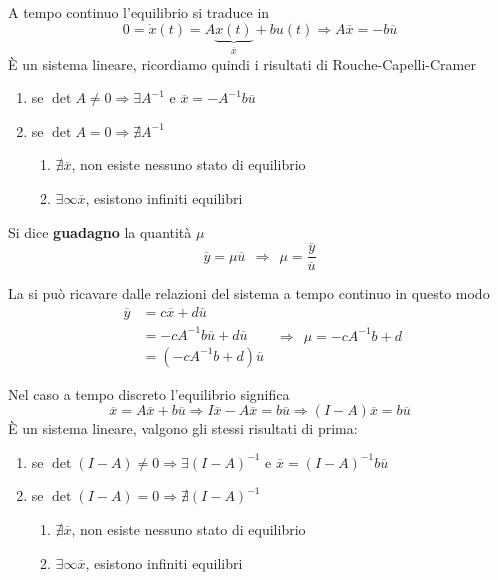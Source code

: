 \documentclass[10pt,a4paper]{book}
\begin{document}
A tempo continuo l'equilibrio si traduce in
\begin{equation*}
	0=\dot{x} (t)=A\underbrace{x(t)}_{\overline{x}} +bu(t)\Rightarrow A\overline{x} =-b\overline{u}
\end{equation*}
È un sistema lineare, ricordiamo quindi i risultati di Rouche-Capelli-Cramer
\begin{enumerate}
	\item se $\det A\neq 0\Rightarrow \exists A^{-1}$ e $\boxed{\overline{x} =-A^{-1} b\overline{u}}$
	\item se $\det A=0\Rightarrow \nexists A^{-1}$
	      \begin{enumerate}
	      	\item $\nexists \overline{x}$, non esiste nessuno stato di equilibrio
	      	\item $\exists \infty \overline{x}$, esistono infiniti equilibri
	      \end{enumerate}
\end{enumerate}
\begin{definition}
	Si dice \textbf{guadagno} la quantità $\mu $
	\begin{equation*}
		\overline{y} =\mu \overline{u} \ \ \Rightarrow \ \ \boxed{\mu =\frac{\overline{y}}{\overline{u}}}
	\end{equation*}
\end{definition}
La si può ricavare dalle relazioni del sistema a tempo continuo in questo modo
\begin{equation*}
	\begin{aligned}
		\overline{y} & =c\overline{x} +d\overline{u}           \\
		             & =-cA^{-1} b\overline{u} +d\overline{u}  \\
		             & =\left(-cA^{-1} b+d\right)\overline{u} 
	\end{aligned} \ \ \Rightarrow \ \ \boxed{\mu =-cA^{-1} b+d}
\end{equation*}

Nel caso a tempo discreto l'equilibrio significa
\begin{equation*}
	\overline{x} =A\overline{x} +b\overline{u} \Rightarrow I\overline{x} -A\overline{x} =b\overline{u} \Rightarrow (I-A)\overline{x} =b\overline{u}
\end{equation*}
È un sistema lineare, valgono gli stessi risultati di prima:
\begin{enumerate}
	\item se $\det(I-A) \neq 0\Rightarrow \exists (I-A)^{-1}$ e $\boxed{\overline{x} =(I-A)^{-1} b\overline{u}}$
	\item se $\det(I-A) =0\Rightarrow \nexists (I-A)^{-1}$
	      \begin{enumerate}
	      	\item $\nexists \overline{x}$, non esiste nessuno stato di equilibrio
	      	\item $\exists \infty \overline{x}$, esistono infiniti equilibri
	      \end{enumerate}
\end{enumerate}
\end{document}
